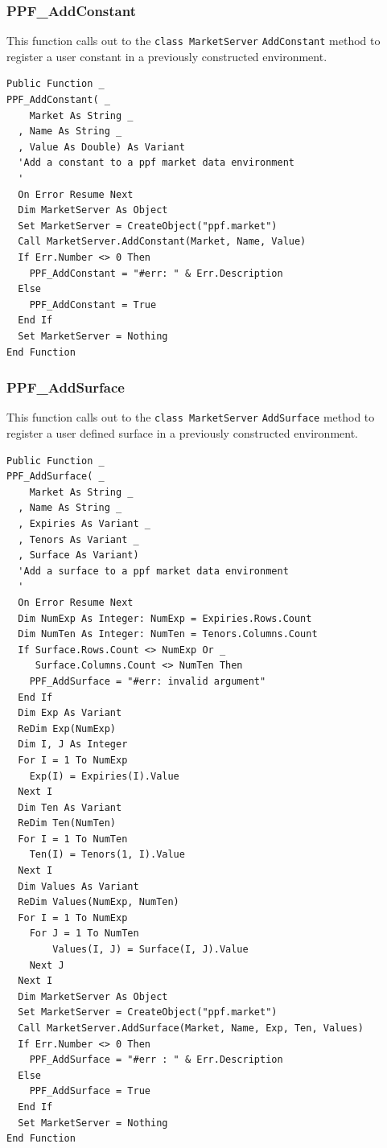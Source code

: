 \subsubsection{PPF\_AddConstant}
This function calls out to the \verb|class MarketServer|
\verb|AddConstant| method to register a user constant in a previously
constructed environment.
\begin{verbatim}
Public Function _
PPF_AddConstant( _
    Market As String _
  , Name As String _
  , Value As Double) As Variant
  'Add a constant to a ppf market data environment
  '
  On Error Resume Next
  Dim MarketServer As Object
  Set MarketServer = CreateObject("ppf.market")
  Call MarketServer.AddConstant(Market, Name, Value)
  If Err.Number <> 0 Then
    PPF_AddConstant = "#err: " & Err.Description
  Else
    PPF_AddConstant = True
  End If
  Set MarketServer = Nothing
End Function
\end{verbatim}

\subsubsection{PPF\_AddSurface}
This function calls out to the \verb|class MarketServer|
\verb|AddSurface| method to register a user defined surface in a previously
constructed environment.
\begin{verbatim}
Public Function _
PPF_AddSurface( _
    Market As String _
  , Name As String _
  , Expiries As Variant _
  , Tenors As Variant _
  , Surface As Variant)
  'Add a surface to a ppf market data environment
  '
  On Error Resume Next
  Dim NumExp As Integer: NumExp = Expiries.Rows.Count
  Dim NumTen As Integer: NumTen = Tenors.Columns.Count
  If Surface.Rows.Count <> NumExp Or _
     Surface.Columns.Count <> NumTen Then
    PPF_AddSurface = "#err: invalid argument"
  End If
  Dim Exp As Variant
  ReDim Exp(NumExp)
  Dim I, J As Integer
  For I = 1 To NumExp
    Exp(I) = Expiries(I).Value
  Next I
  Dim Ten As Variant
  ReDim Ten(NumTen)
  For I = 1 To NumTen
    Ten(I) = Tenors(1, I).Value
  Next I
  Dim Values As Variant
  ReDim Values(NumExp, NumTen)
  For I = 1 To NumExp
    For J = 1 To NumTen
        Values(I, J) = Surface(I, J).Value
    Next J
  Next I
  Dim MarketServer As Object
  Set MarketServer = CreateObject("ppf.market")
  Call MarketServer.AddSurface(Market, Name, Exp, Ten, Values)
  If Err.Number <> 0 Then
    PPF_AddSurface = "#err : " & Err.Description
  Else
    PPF_AddSurface = True
  End If
  Set MarketServer = Nothing
End Function
\end{verbatim}

